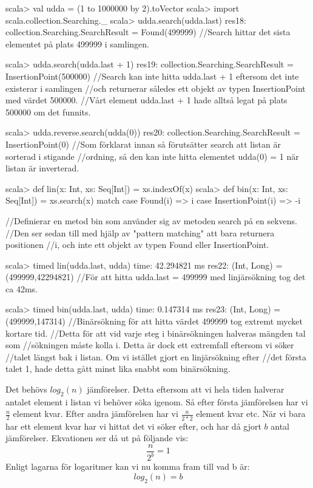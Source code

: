 \begin{REPLnonum}
scala> val udda = (1 to 1000000 by 2).toVector
scala> import scala.collection.Searching._
scala> udda.search(udda.last)
res18: collection.Searching.SearchResult = Found(499999)
//Search hittar det sista elementet på plats 499999 i samlingen.

scala> udda.search(udda.last + 1)
res19: collection.Searching.SearchResult = InsertionPoint(500000)
//Search kan inte hitta udda.last + 1 eftersom det inte existerar i samlingen
//och returnerar således ett objekt av typen InsertionPoint med värdet 500000.
//Vårt element udda.last + 1 hade alltså legat på plats 500000 om det funnits.

scala> udda.reverse.search(udda(0))
res20: collection.Searching.SearchResult = InsertionPoint(0)
//Som förklarat innan så förutsätter search att listan är sorterad i stigande
//ordning, så den kan inte hitta elementet udda(0) = 1 när listan är inverterad.

scala> def lin(x: Int, xs: Seq[Int]) = xs.indexOf(x)
scala> def bin(x: Int, xs: Seq[Int]) = xs.search(x) match 
	case Found(i) => i
	case InsertionPoint(i) => -i

//Definierar en metod bin som använder sig av metoden search på en sekvens.
//Den ser sedan till med hjälp av "pattern matching" att bara returnera positionen
//i, och inte ett objekt av typen Found eller InsertionPoint.

scala> timed{ lin(udda.last, udda) }
time: 42.294821 ms
res22: (Int, Long) = (499999,42294821)
//För att hitta udda.last = 499999 med linjärsökning tog det ca 42ms.

scala> timed{ bin(udda.last, udda) }
time: 0.147314 ms
res23: (Int, Long) = (499999,147314)
//Binärsökning för att hitta värdet 499999 tog extremt mycket kortare tid.
//Detta för att vid varje steg i binärsökningen halveras mängden tal som
//sökningen måste kolla i. Detta är dock ett extremfall eftersom vi söker
//talet längst bak i listan. Om vi istället gjort en linjärsökning efter
//det första talet 1, hade detta gått minst lika snabbt som binärsökning.
\end{REPLnonum}

\SubtaskSolved
Det behövs $log_2(n)$ jämförelser. Detta eftersom att vi hela tiden halverar antalet element i listan vi behöver söka igenom. Så efter första jämförelsen har vi $\frac{n}{2}$ element kvar. Efter andra jämförelsen har vi $\frac{n}{2*2}$ element kvar etc. När vi bara har ett element kvar har vi hittat det vi söker efter, och har då gjort $b$ antal jämförelser. Ekvationen ser då ut på följande vis:
\begin{equation*}
\frac{n}{2^b} = 1
\end{equation*}
Enligt lagarna för logaritmer kan vi nu komma fram till vad b är:
\begin{equation*}
log_2(n) = b
\end{equation*}

